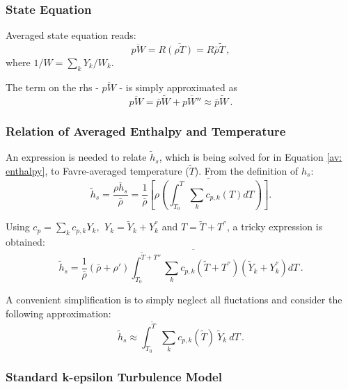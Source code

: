 \subsubsection{State Equation}

Averaged state equation reads:
\begin{equation}
\overline{p W} = R \overline{\left( \rho T \right)} = R \bar{\rho} \tilde{T} \, ,
\end{equation}
where $1/W = \sum_k Y_k/W_k$.

The term on the rhs - $\overline{p W}$ - is simply approximated as
\begin{equation}
\overline{p W} = \bar{p}\tilde{W}+\overline{p W''} \approx \bar{p}\tilde{W} \, .
\end{equation}

\subsubsection{Relation of Averaged Enthalpy and Temperature}

An expression is needed to relate $\tilde{h}_s$, which is being solved for in Equation \eqref{av: enthalpy}, to Favre-averaged temperature ($\tilde{T}$). From the definition of $h_s$:
\begin{equation}
\tilde{h}_s =\frac{\overline{\rho h_s}}{\bar{\rho}} = \frac{1}{\bar{\rho}}\overline{\left[ \rho \left( \int_{T_0}^{T} \sum_k c_{p,k}(T) dT \right)\right] }.
\end{equation}

Using $c_p=\sum_k c_{p,k} Y_k$, $\ Y_k = \tilde{Y}_k + Y_{k}^{''}$ and $T = \tilde{T}+ T^{''}$, a tricky expression is obtained:
\begin{equation}
\tilde{h}_s = \frac{1}{\bar{\rho}} \overline{\left(\bar{\rho}+\rho' \right) \int_{T_0}^{\tilde{T}+T''} \sum_k c_{p,k} \left(\tilde{T}+ T^{''}\right) \left(\tilde{Y}_k+Y^{''}_k \right) dT} \, .
\end{equation}

A convenient simplification is to simply neglect all fluctations and consider the following approximation:
\begin{equation}
\tilde{h}_s \approx \int_{T_0}^{\tilde{T}} \sum_k c_{p,k}(\tilde{T})\ \tilde{Y}_k\ dT \, .
\end{equation}

\subsubsection{Standard k-epsilon Turbulence Model}

